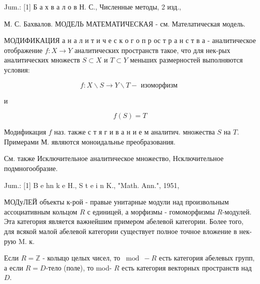 \documentclass[10pt]{article}
\begin{document}
Jum.: [1] Б а х в а л о в Н. С., Численные методы, 2 изд.,

М. С. Бахвалов. МОДЕЛЬ МАТЕМАТИЧЕСКАЯ - см. Мателатическая модель.



МОДИФИКАЦИЯ а н а л и т и ч е с к о г о п р ос т р а н с т в а - аналитическое отображение $f: X \rightarrow Y$ аналитических пространств такое, что для нек-рых аналитических множеств $S \subset X$ и $T \subset Y$ меньших размерностей выполняются условия:



\[

f: X \backslash S \longrightarrow Y \backslash T-\text { изоморфизм }

\]



и



\[

f(S)=T

\]



Модификация $f$ наз. также с т я г и в а н и е м аналитич. множества $S$ на $T$. Примерами М. являются моноидальнье преобразования.



См. также Исключительное аналитическое множество, Нсключительное подмногообразие.



Jum.: [1] B e hn k e H., S t e i n K., "Math. Ann.", 1951,



МОДуЛЕЙ объекты к-рой - правые унитарные модули над произвольным ассоциативным кольцом $R$ с единицей, а морфизмы - гомоморфизмы $R$-модулей. Эта категория является важнейшим примером абелевой категории. Более того, для всякой малой абелевой категории существует полное точное вложение в нек-рую $\mathrm{M}$. к.



Если $R=\mathbb{Z}$ - колыцо целых чисел, то $\bmod -R$ есть категория абелевых групп, а если $R=D$-тело (поле), то mod- $R$ есть категория векторных пространств над $D$.
\end{document}

